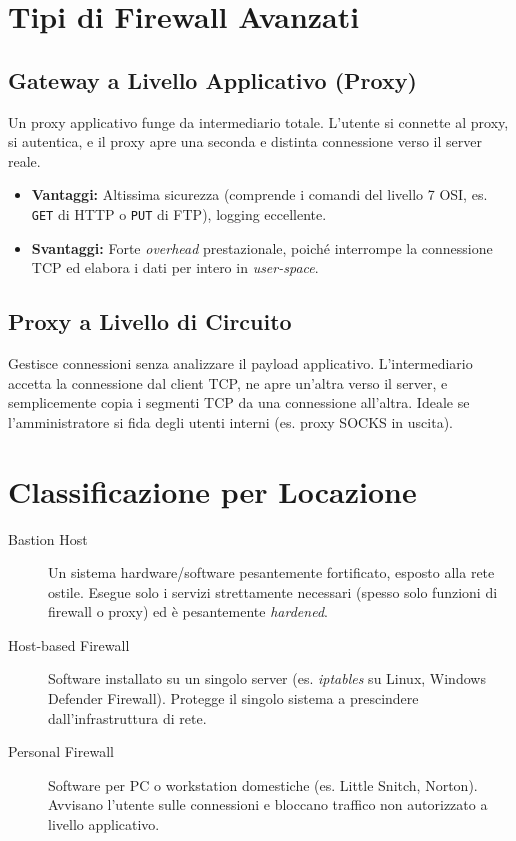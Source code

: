 \section{Tipi di Firewall Avanzati}

\subsection{Gateway a Livello Applicativo (Proxy)}
Un proxy applicativo funge da intermediario totale. L'utente si connette al proxy, si autentica, e il proxy apre una seconda e distinta connessione verso il server reale.
\begin{itemize}
    \item \textbf{Vantaggi:} Altissima sicurezza (comprende i comandi del livello 7 OSI, es. \texttt{GET} di HTTP o \texttt{PUT} di FTP), logging eccellente.
    \item \textbf{Svantaggi:} Forte \textit{overhead} prestazionale, poiché interrompe la connessione TCP ed elabora i dati per intero in \textit{user-space}.
\end{itemize}

\subsection{Proxy a Livello di Circuito}
Gestisce connessioni senza analizzare il payload applicativo. L'intermediario accetta la connessione dal client TCP, ne apre un'altra verso il server, e semplicemente copia i segmenti TCP da una connessione all'altra. Ideale se l'amministratore si fida degli utenti interni (es. proxy SOCKS in uscita).

\section{Classificazione per Locazione}

\begin{description}
    \item[Bastion Host] Un sistema hardware/software pesantemente fortificato, esposto alla rete ostile. Esegue solo i servizi strettamente necessari (spesso solo funzioni di firewall o proxy) ed è pesantemente \textit{hardened}.
    \item[Host-based Firewall] Software installato su un singolo server (es. \textit{iptables} su Linux, Windows Defender Firewall). Protegge il singolo sistema a prescindere dall'infrastruttura di rete.
    \item[Personal Firewall] Software per PC o workstation domestiche (es. Little Snitch, Norton). Avvisano l'utente sulle connessioni e bloccano traffico non autorizzato a livello applicativo.
\end{description}

